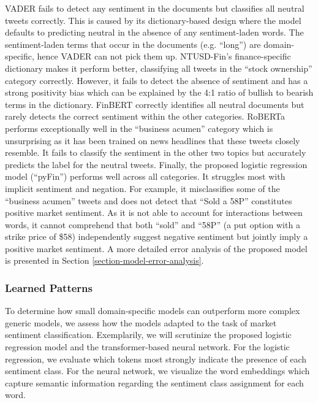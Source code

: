 VADER fails to detect any sentiment in the documents but classifies all neutral tweets correctly. This is caused by its dictionary-based design where the model defaults to predicting neutral in the absence of any sentiment-laden words. The sentiment-laden terms that occur in the documents (e.g. ``long'') are domain-specific, hence VADER can not pick them up. NTUSD-Fin's finance-specific dictionary makes it perform better, classifying all tweets in the ``stock ownership'' category correctly. However, it fails to detect the absence of sentiment and has a strong positivity bias which can be explained by the 4:1 ratio of bullish to bearish terms in the dictionary. FinBERT correctly identifies all neutral documents but rarely detects the correct sentiment within the other categories. RoBERTa performs exceptionally well in the ``business acumen'' category which is unsurprising as it has been trained on news headlines that these tweets closely resemble. It fails to classify the sentiment in the other two topics but accurately predicts the label for the neutral tweets. Finally, the proposed logistic regression model (``pyFin'') performs well across all categories. It struggles most with implicit sentiment and negation. For example, it misclassifies some of the ``business acumen'' tweets and does not detect that ``Sold a 58P'' constitutes positive market sentiment. As it is not able to account for interactions between words, it cannot comprehend that both ``sold'' and ``58P'' (a put option with a strike price of \$58) independently suggest negative sentiment but jointly imply a positive market sentiment. A more detailed error analysis of the proposed model is presented in Section \ref{section-model-error-analysis}.


\subsubsection{Learned Patterns}

To determine how small domain-specific models can outperform more complex generic models, we assess how the models adapted to the task of market sentiment classification. Exemplarily, we will scrutinize the proposed logistic regression model and the transformer-based neural network. For the logistic regression, we evaluate which tokens most strongly indicate the presence of each sentiment class. For the neural network, we visualize the word embeddings which capture semantic information regarding the sentiment class assignment for each word.


